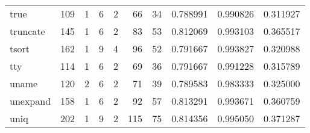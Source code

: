 \begin{tabular}{lrrrrrrrrr}
true      &                    109 &                                  1 &                                 6 &                                2 &                                66 &                              34 &                                0.788991 &                               0.990826 &                             0.311927 \\
truncate  &                    145 &                                  1 &                                 6 &                                2 &                                83 &                              53 &                                0.812069 &                               0.993103 &                             0.365517 \\
tsort     &                    162 &                                  1 &                                 9 &                                4 &                                96 &                              52 &                                0.791667 &                               0.993827 &                             0.320988 \\
tty       &                    114 &                                  1 &                                 6 &                                2 &                                69 &                              36 &                                0.791667 &                               0.991228 &                             0.315789 \\
uname     &                    120 &                                  2 &                                 6 &                                2 &                                71 &                              39 &                                0.789583 &                               0.983333 &                             0.325000 \\
unexpand  &                    158 &                                  1 &                                 6 &                                2 &                                92 &                              57 &                                0.813291 &                               0.993671 &                             0.360759 \\
uniq      &                    202 &                                  1 &                                 9 &                                2 &                               115 &                              75 &                                0.814356 &                               0.995050 &                             0.371287 \\

\end{tabular}
